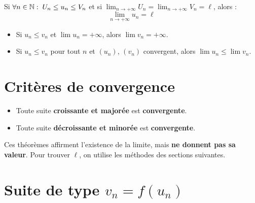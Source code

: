 \begin{propriete}
  Si $\forall n \in \mathbb{N} : \; U_n \leq u_n \leq V_n$
  et si $\displaystyle\lim_{n\to+\infty} U_n
       = \lim_{n\to+\infty} V_n = \ell$,
  alors :
  \[
    \lim_{n \to +\infty} u_n = \ell
  \]
\end{propriete}

\begin{propriete}[Th\'{e}or\`{e}me de comparaison]
  \begin{itemize}
    \item Si $u_n \leq v_n$ et $\displaystyle\lim u_n = +\infty$,
          alors $\displaystyle\lim v_n = +\infty$.
    \item Si $u_n \leq v_n$ pour tout $n$ et $(u_n)$, $(v_n)$
          convergent, alors $\displaystyle\lim u_n \leq \lim v_n$.
  \end{itemize}
\end{propriete}
\newpage

\section{Crit\`{e}res de convergence}

\begin{theoreme}
  \begin{itemize}
    \item Toute suite \textbf{croissante et major\'{e}e} est \textbf{convergente}.
    \item Toute suite \textbf{d\'{e}croissante et minor\'{e}e} est \textbf{convergente}.
  \end{itemize}
\end{theoreme}

\begin{attention}
  Ces th\'{e}or\`{e}mes affirment l'existence de la limite,
  mais \textbf{ne donnent pas sa valeur}.
  Pour trouver $\ell$, on utilise les m\'{e}thodes des sections suivantes.
\end{attention}

\section{Suite de type \texorpdfstring{$v_n = f(u_n)$}{v\_n = f(u\_n)}}

